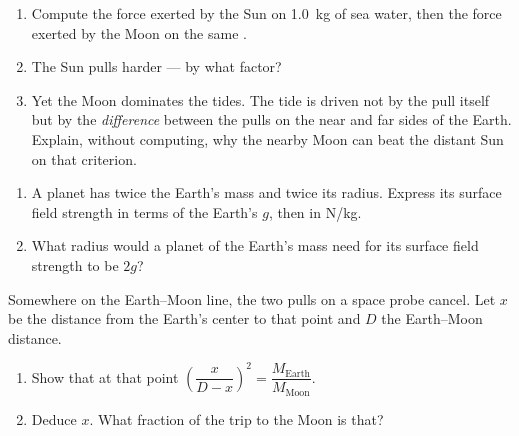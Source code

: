 \begin{exercise}[$\star\star$]\label{exo:g10:universal-gravitation:10}
\begin{enumerate}
  \item Compute the force exerted by the Sun on \qty{1.0}{kg} of sea
        water, then the force exerted by the Moon on the same
        .
  \item The Sun pulls harder --- by what factor?
  \item Yet the Moon dominates the tides. The tide is driven not by the
        pull itself but by the \emph{difference} between the pulls on
        the near and far sides of the Earth. Explain, without
        computing, why the nearby Moon can beat the distant Sun on
        that criterion.
\end{enumerate}
\end{exercise}

\begin{exercise}[$\star\star$]\label{exo:g10:universal-gravitation:11}
\begin{enumerate}
  \item A planet has twice the Earth's mass and twice its radius.
        Express its surface field strength in terms of the Earth's
        $g$, then in \unit{N/kg}.
  \item What radius would a planet of the Earth's mass need for its
        surface field strength to be $2g$?
\end{enumerate}
\end{exercise}

\begin{exercise}[$\star\star\star$]\label{exo:g10:universal-gravitation:12}
Somewhere on the Earth--Moon line, the two pulls on a space probe
cancel. Let $x$ be the distance from the Earth's center to that point
and $D$ the Earth--Moon distance.
\begin{enumerate}
  \item Show that at that point
        $\left(\dfrac{x}{D - x}\right)^{2}
        = \dfrac{M_{\text{Earth}}}{M_{\text{Moon}}}$.
  \item Deduce $x$. What fraction of the trip to the Moon is that?
\end{enumerate}
\end{exercise}

